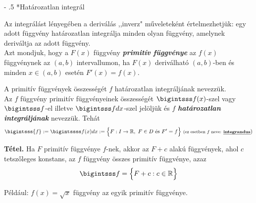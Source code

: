 \documentclass[12pt,margin=0px]{article}
\makeatletter
\newcommand{\R}{\mathbb{R}}
\renewcommand\paragraph{%
	\@startsection{paragraph}{4}{0mm}%
	{-\baselineskip}%
	{.5\baselineskip}%
	{\normalfont\normalsize\bfseries}}
\makeatother
\begin{document}
    \paragraph*{Határozatlan integrál}

    \noindent Az integrálást lényegében a deriválás ,,inverz" műveleteként értelmezhetjük: egy adott függvény határozatlan integrálja minden olyan függvény, amelynek deriváltja az adott függvény.\\

    \noindent Azt mondjuk, hogy a $F(x)$ függvény \emph{\textbf{primitív függvénye}} az $f(x)$ függvénynek az $(a, b)$ intervallumon, ha $F(x)$ deriválható $(a, b)$-ben és minden $x \in (a, b)$ esetén $F'(x) = f(x)$.

    \noindent A primitív függvények összességét $f$ határozatlan integráljának nevezzük.\\

    \noindent Az $f$ függvény primitív függvényeinek összességét $\bigintsss f(x)$-szel vagy $\bigintsss f$-el illetve $\bigintsss f dx$-szel jelöljük és $f$ \textbf{\emph{határozatlan integráljának}} nevezzük. Tehát
    \[
		\bigintsss{f} := \bigintssss f(x)dx :=  \Big\{F:I \rightarrow \R,\ F \in D\ \text{és}\ F' = f \Big\}\ \text{\footnotesize (ez esetben $f$ neve: \emph{\textbf{integrandus}}})
    \]

    \noindent \textbf{Tétel.} Ha $F$ primitív függvénye $f$-nek, akkor az $F + c$ alakú függvények, ahol $c$ tetszőleges konstans, az $f$ függvény összes primitív függvénye, azaz
    \[
        \bigintsss f = \Big\{F + c: c \in \mathbb{R}\Big\}
    \]

    \noindent Például: $f(x) = \sqrt{x}$ függvény az egyik primitív függvénye.
      \begin{center}
        \end{center}
\end{document}
